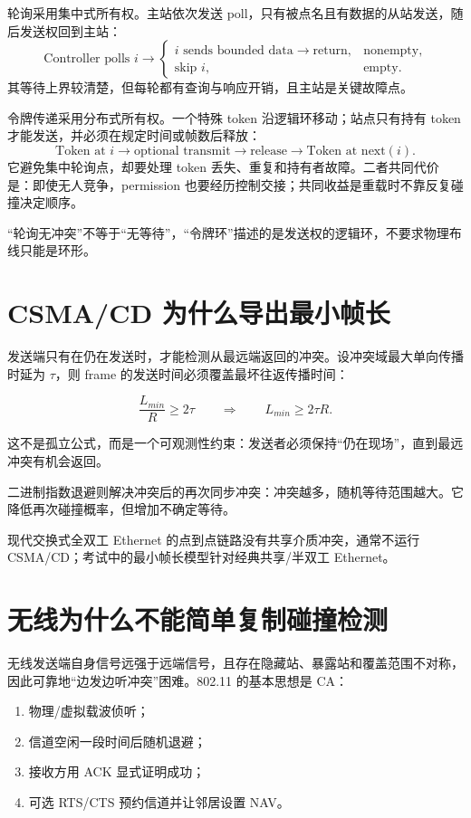 \documentclass[UTF8,fontset=none,11pt,a4paper]{ctexart}
\providecommand{\tightlist}{\setlength{\itemsep}{0pt}\setlength{\parskip}{0pt}}
\begin{document}
轮询采用集中式所有权。主站依次发送 poll，只有被点名且有数据的从站发送，随后发送权回到主站：
\[
\text{Controller polls }i\to
\begin{cases}
i\text{ sends bounded data}\to\text{return},&\text{nonempty},\\
\text{skip }i,&\text{empty}.
\end{cases}
\]
其等待上界较清楚，但每轮都有查询与响应开销，且主站是关键故障点。

令牌传递采用分布式所有权。一个特殊 token 沿逻辑环移动；站点只有持有 token 才能发送，并必须在规定时间或帧数后释放：
\[
\text{Token at }i\to\text{optional transmit}\to\text{release}\to\text{Token at next}(i).
\]
它避免集中轮询点，却要处理 token 丢失、重复和持有者故障。二者共同代价是：即使无人竞争，permission 也要经历控制交接；共同收益是重载时不靠反复碰撞决定顺序。

“轮询无冲突”不等于“无等待”，“令牌环”描述的是发送权的逻辑环，不要求物理布线只能是环形。

\section{CSMA/CD
为什么导出最小帧长}\label{5-csmacd-ux4e3aux4ec0ux4e48ux5bfcux51faux6700ux5c0fux5e27ux957f}

发送端只有在仍在发送时，才能检测从最远端返回的冲突。设冲突域最大单向传播时延为
\(\tau\)，则 frame 的发送时间必须覆盖最坏往返传播时间：

\[
\frac{L_{min}}{R}\ge 2\tau
\qquad\Longrightarrow\qquad
L_{min}\ge 2\tau R.
\]

这不是孤立公式，而是一个可观测性约束：发送者必须保持``仍在现场''，直到最远冲突有机会返回。

二进制指数退避则解决冲突后的再次同步冲突：冲突越多，随机等待范围越大。它降低再次碰撞概率，但增加不确定等待。

现代交换式全双工 Ethernet 的点到点链路没有共享介质冲突，通常不运行
CSMA/CD；考试中的最小帧长模型针对经典共享/半双工 Ethernet。

\section{无线为什么不能简单复制碰撞检测}\label{6-ux65e0ux7ebfux4e3aux4ec0ux4e48ux4e0dux80fdux7b80ux5355ux590dux5236ux78b0ux649eux68c0ux6d4b}

无线发送端自身信号远强于远端信号，且存在隐藏站、暴露站和覆盖范围不对称，因此可靠地``边发边听冲突''困难。802.11
的基本思想是 CA：

\begin{enumerate}
\def\labelenumi{\arabic{enumi}.}
\tightlist
\item
  物理/虚拟载波侦听；
\item
  信道空闲一段时间后随机退避；
\item
  接收方用 ACK 显式证明成功；
\item
  可选 RTS/CTS 预约信道并让邻居设置 NAV。
\end{enumerate}
\end{document}
